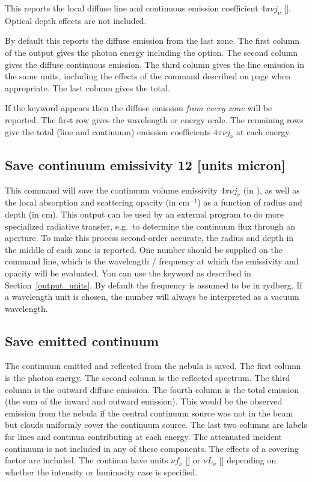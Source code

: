 This reports the local diffuse line and continuous emission
coefficient $4 \pi \nu j_{\nu}$ [\ergpccmps ].
Optical depth effects are not included.

By default this reports the diffuse emission from the last zone.
The first column of the output gives
the photon energy including the  option.
The second column gives the diffuse continuous emission.
The third column gives the line emission in the same units,
including the effects of the
 command described on page
\pageref{sec:CommandSetSaveLWidth} when appropriate.
The last column gives the total.

If the keyword  appears then the diffuse emission
\emph{from every zone} will be reported.
The first row gives the wavelength or energy scale.
The remaining rows give the total (line and continuum)
emission coefficients $4 \pi \nu j_{\nu}$
at each energy.

\subsection{Save continuum emissivity 12 [units micron]}

This command will save the continuum volume emissivity $4\pi \nu j_\nu$ (in
\ergpccmps), as well as the local absorption and scattering opacity (in
cm$^{-1}$) as a function of radius and depth (in cm). This output can be used by an
external program to do more specialized radiative transfer, e.g.\ to determine
the continuum flux through an aperture. To make this process second-order
accurate, the radius and depth in the middle of each zone is reported. One number should
be supplied on the command line, which is the wavelength / frequency at which
the emissivity and opacity will be evaluated. You can use the keyword
 as described in Section~\ref{output_units}. By default the
frequency is assumed to be in rydberg. If a wavelength unit is chosen, the number
will always be interpreted as a vacuum wavelength.

\subsection{Save emitted continuum}

The continuum emitted and reflected from the nebula is saved.
The
first column is the photon energy.
The second column is the reflected
spectrum.
The third column is the outward diffuse emission.
The fourth
column is the total emission (the sum of the inward and outward emission).
This would be the observed emission from the nebula if the central continuum
source was not in the beam but clouds uniformly cover the continuum source.
The last two columns are labels for lines and continua contributing at each
energy.
The attenuated incident continuum is not included in any of these
components.
The effects of a covering factor are included.
The continua have units
$\nu f_{\nu}$ [\ergpscmps ] or $\nu L_{\nu}$ [\ergps ] 
depending on whether the intensity or luminosity case is specified.

